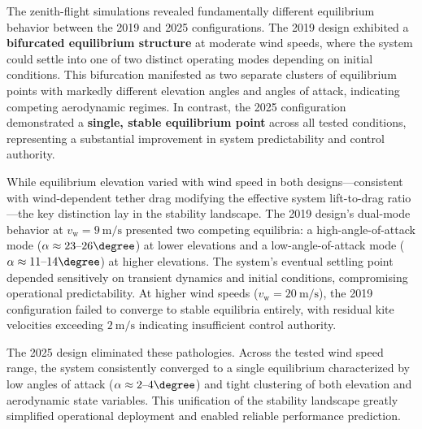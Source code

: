 The zenith-flight simulations revealed fundamentally different equilibrium behavior between the 2019 and 2025 configurations. The 2019 design exhibited a \textbf{bifurcated equilibrium structure} at moderate wind speeds, where the system could settle into one of two distinct operating modes depending on initial conditions. This bifurcation manifested as two separate clusters of equilibrium points with markedly different elevation angles and angles of attack, indicating competing aerodynamic regimes. In contrast, the 2025 configuration demonstrated a \textbf{single, stable equilibrium point} across all tested conditions, representing a substantial improvement in system predictability and control authority. 

While equilibrium elevation varied with wind speed in both designs---consistent with wind-dependent tether drag modifying the effective system lift-to-drag ratio---the key distinction lay in the stability landscape. The 2019 design's dual-mode behavior at $v_{\mathrm{w}}=9~\unit{\metre\per\second}$ presented two competing equilibria: a high-angle-of-attack mode ($\alpha \approx 23\text{--}26\degree$) at lower elevations and a low-angle-of-attack mode ($\alpha \approx 11\text{--}14\degree$) at higher elevations. The system's eventual settling point depended sensitively on transient dynamics and initial conditions, compromising operational predictability. At higher wind speeds ($v_{\mathrm{w}}=20~\unit{\metre\per\second}$), the 2019 configuration failed to converge to stable equilibria entirely, with residual kite velocities exceeding $2~\unit{\metre\per\second}$ indicating insufficient control authority.

The 2025 design eliminated these pathologies. Across the tested wind speed range, the system consistently converged to a single equilibrium characterized by low angles of attack ($\alpha \approx 2\text{--}4\degree$) and tight clustering of both elevation and aerodynamic state variables. This unification of the stability landscape greatly simplified operational deployment and enabled reliable performance prediction.

